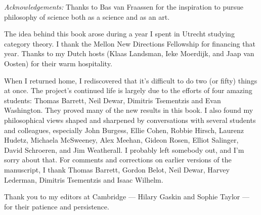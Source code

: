 \documentclass[12pt,fleqn,toc]{book}
\numberwithin{section}{chapter}
\numberwithin{subsection}{section}
\numberwithin{prop}{section}
\theoremstyle{definition}
\newcommand{\2}{\mathscr}
\newcommand{\7}{\mathbb}
\begin{document}
\bigskip

{\it Acknowledgements:} Thanks to Bas van Fraassen for the inspiration
to pursue philosophy of science both as a science and as an art.

The idea behind this book arose during a year I spent in Utrecht
studying category theory.  I thank the Mellon New Directions
Fellowship for financing that year.  Thanks to my Dutch hosts (Klaas
Landsman, Ieke Moerdijk, and Jaap van Oosten) for their warm
hospitality.

When I returned home, I rediscovered that it's difficult to do two (or
fifty) things at once.  The project's continued life is largely due to
the efforts of four amazing students: Thomas Barrett, Neil Dewar,
Dimitris Tsementzis and Evan Washington.  They proved many of the new
results in this book.  I also found my philosophical views shaped and
sharpened by conversations with several students and colleagues,
especially John Burgess, Ellie Cohen, Robbie Hirsch, Laurenz Hudetz,
Michaela McSweeney, Alex Meehan, Gideon Rosen, Elliot Salinger, David
Schroeren, and Jim Weatherall.  I probably left somebody out, and I'm
sorry about that.  For comments and corrections on earlier versions of
the manuscript, I thank Thomas Barrett, Gordon Belot, Neil Dewar,
Harvey Lederman, Dimitris Tsementzis and Isaac Wilhelm.

Thank you to my editors at Cambridge --- Hilary Gaskin and Sophie
Taylor --- for their patience and persistence.






\mainmatter














% 
% 

% 









\backmatter



\end{document}
